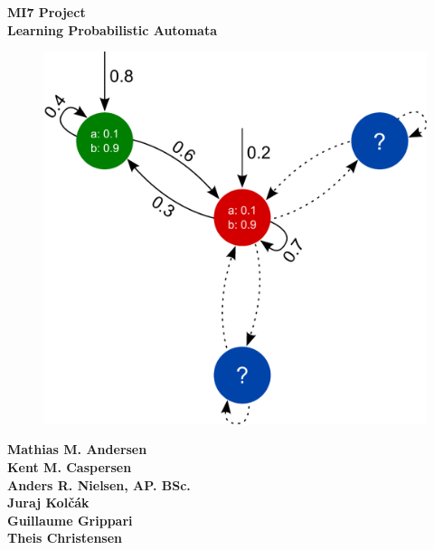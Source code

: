\begin{titlepage}
	\begin{center}
		\textup{\small {\bf MI7 Project}}\\[0.2in]	
		\Large \textbf {Learning Probabilistic Automata}\\[0.5in]
		
		\begin{figure}[!h]
			\centering
			\includegraphics[width=1\linewidth]{pictures/frontpagemodel.pdf}
			\label{fig:Frontpage}
		\end{figure}
	\end{center}
	\begin{centering}
	\textbf{Mathias M. Andersen\\
	Kent M. Caspersen\\
	Anders R. Nielsen, AP. BSc.\\
	Juraj Kol\v{c}\'{a}k\\
	Guillaume Grippari\\
	Theis Christensen\\}
	\end{centering}		
	
\end{titlepage}
